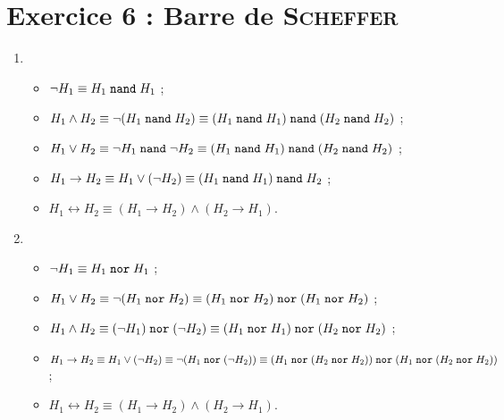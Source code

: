 \section{Exercice 6 : Barre de {\scshape Scheffer}}

\def\nand{\mathrel{{\tt nand}}}
\def\nor{\mathrel{{\tt nor}}}

\begin{enumerate}
	\item \begin{itemize}
			\item $\lnot H_1 \equiv H_1 \nand H_1$\/ ;
			\item $H_1 \land H_2 \equiv \lnot (H_1 \nand H_2) \equiv (H_1 \nand H_1) \nand (H_2 \nand H_2)$\/ ;
			\item $H_1 \lor H_2 \equiv \lnot H_1 \nand \lnot H_2 \equiv (H_1 \nand H_1) \nand (H_2 \nand H_2)$\/ ;
			\item $H_1 \to H_2 \equiv H_1 \lor (\lnot H_2) \equiv (H_1 \nand H_1) \nand H_2$ ;
			\item $H_1 \leftrightarrow H_2 \equiv (H_1 \to H_2) \land (H_2 \to H_1)$.
		\end{itemize}
	\item \begin{itemize}
		\item $\lnot H_1 \equiv H_1 \nor H_1$\/ ;
		\item $H_1 \lor H_2 \equiv \lnot (H_1 \nor H_2) \equiv (H_1 \nor H_2) \nor (H_1 \nor H_2)$\/ ;
		\item $H_1 \land H_2 \equiv (\lnot H_1) \nor (\lnot H_2) \equiv (H_1 \nor H_1) \nor (H_2 \nor H_2)$\/ ;
		\item $H_1\to H_2 \equiv H_1 \lor (\lnot H_2) \equiv \lnot (H_1 \nor (\lnot H_2)) \equiv (H_1 \nor (H_2 \nor H_2)) \nor (H_1 \nor (H_2 \nor H_2))$\/ ;
		\item $H_1 \leftrightarrow H_2 \equiv (H_1 \to H_2) \land (H_2 \to H_1)$.
	\end{itemize}
\end{enumerate}
